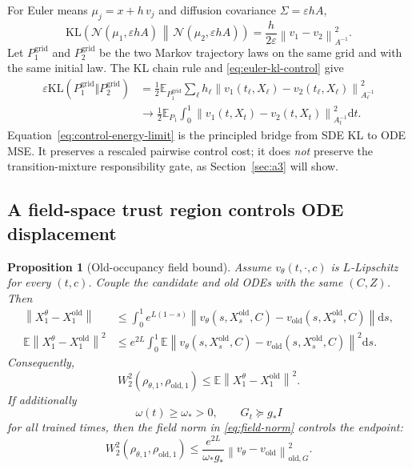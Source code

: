 \documentclass[11pt,a4paper]{article}
\newcommand{\E}{\mathbb{E}}
\newcommand{\N}{\mathcal{N}}
\newcommand{\KL}{\mathrm{KL}}
\newcommand{\norm}[1]{\left\lVert #1 \right\rVert}
\newcommand{\dd}{\mathrm{d}}
\newcommand{\vold}{v_{\mathrm{old}}}
\newcommand{\vtheta}{v_\theta}
\theoremstyle{plain}
\newtheorem{proposition}[theorem]{Proposition}
\theoremstyle{definition}
\begin{document}
For Euler means $\mu_j=x+h\,v_j$ and diffusion covariance
$\Sigma=\varepsilon h A$,
\begin{equation}
\KL\!\left(
  \N(\mu_1,\varepsilon hA)
  \,\middle\Vert\,
  \N(\mu_2,\varepsilon hA)
\right)
=\frac{h}{2\varepsilon}\norm{v_1-v_2}_{A^{-1}}^2 .
\label{eq:euler-kl-control}
\end{equation}
Let $P_1^{\mathrm{grid}}$ and $P_2^{\mathrm{grid}}$ be the two Markov trajectory laws on the same
grid and with the same initial law.  The KL chain rule and \eqref{eq:euler-kl-control} give
\begin{align}
\varepsilon\KL(P_1^{\mathrm{grid}}\Vert P_2^{\mathrm{grid}})
&=
\frac12
\E_{P_1^{\mathrm{grid}}}
\sum_\ell h_\ell
\norm{
  v_1(t_\ell,X_\ell)-v_2(t_\ell,X_\ell)
}_{A_\ell^{-1}}^2
\nonumber\\
&\longrightarrow
\frac12
\E_{P_1}
\int_0^1
\norm{v_1(t,X_t)-v_2(t,X_t)}_{A_t^{-1}}^2\dd t .
\label{eq:control-energy-limit}
\end{align}
Equation~\eqref{eq:control-energy-limit} is the principled bridge from SDE KL to ODE MSE.  It
preserves a rescaled pairwise control cost; it does \emph{not} preserve the transition-mixture
responsibility gate, as Section~\ref{sec:a3} will show.

\subsection{A field-space trust region controls ODE displacement}

\begin{proposition}[Old-occupancy field bound]
\label{prop:gronwall}
Assume $\vtheta(t,\cdot,c)$ is $L$-Lipschitz for every $(t,c)$.  Couple the candidate and old ODEs
with the same $(C,Z)$.  Then
\begin{align}
\norm{X_1^\theta-X_1^{\mathrm{old}}}
&\le
\int_0^1 e^{L(1-s)}
\norm{
  \vtheta(s,X_s^{\mathrm{old}},C)
  -\vold(s,X_s^{\mathrm{old}},C)
}\dd s,
\label{eq:pathwise-gronwall}\\
\E\norm{X_1^\theta-X_1^{\mathrm{old}}}^2
&\le
e^{2L}
\int_0^1
\E\norm{
  \vtheta(s,X_s^{\mathrm{old}},C)
  -\vold(s,X_s^{\mathrm{old}},C)
}^2\dd s .
\label{eq:mean-gronwall}
\end{align}
Consequently,
\begin{equation}
W_2^2(\rho_{\theta,1},\rho_{\mathrm{old},1})
\le
\E\norm{X_1^\theta-X_1^{\mathrm{old}}}^2 .
\label{eq:w2-coupling}
\end{equation}
If additionally
\begin{equation}
\omega(t)\ge\omega_*>0,
\qquad
G_t\succeq g_*I
\label{eq:field-bound-assumptions}
\end{equation}
for all trained times, then the field norm in \eqref{eq:field-norm} controls the endpoint:
\begin{equation}
W_2^2(\rho_{\theta,1},\rho_{\mathrm{old},1})
\le
\frac{e^{2L}}{\omega_*g_*}
\norm{\vtheta-\vold}_{\mathrm{old},G}^2 .
\label{eq:field-norm-endpoint}
\end{equation}
\end{proposition}
\end{document}
